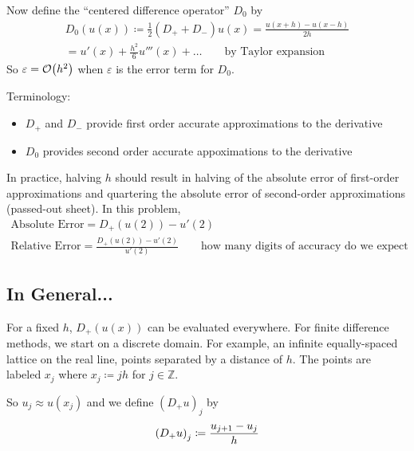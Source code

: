 \documentclass{article}
\newcommand{\E}{\varepsilon}
\begin{document}
            Now define the ``centered difference operator'' $D_0$ by
            \begin{align*}
                D_0(u(x)) \coloneqq \frac{1}{2}(D_+ + D_-)u(x) = \frac{u(x + h) - u(x - h)}{2h} \\
                = u'(x) + \frac{h^2}{6}u'''(x) + \dots \qquad \text{by Taylor expansion}
            \end{align*}
            So $\E = \order{h^2}$ when $\E$ is the error term for $D_0$.

            Terminology:
            \begin{itemize}
                \item $D_+$ and $D_-$ provide first order accurate approximations to the derivative
                \item $D_0$ provides second order accurate appoximations to the derivative
            \end{itemize}

            In practice, halving $h$ should result in halving of the absolute error of first-order approximations and quartering the absolute error of second-order approximations (passed-out sheet).  In this problem,
            \begin{align*}
                \text{Absolute Error} = D_+(u(2)) - u'(2) \\[.1cm]
                \text{Relative Error} = \frac{D_+(u(2)) - u'(2)}{u'(2)} \qquad \text{how many digits of accuracy do we expect}
            \end{align*}

        \subsection{In General...}
            For a fixed $h$, $D_+(u(x))$ can be evaluated everywhere.  For finite difference methods, we start on a discrete domain.  For example, an infinite equally-spaced lattice on the real line, points separated by a distance of $h$.  The points are labeled $x_j$ where $x_j \coloneqq jh$ for $j \in \mathbb{Z}$.

            So $u_j \approx u(x_j)$ and we define $(D_+u)_j$ by
            \begin{align*}
                \qty(D_+u)_j \coloneqq \frac{u_{j+1} - u_j}{h}
            \end{align*}
\end{document}
